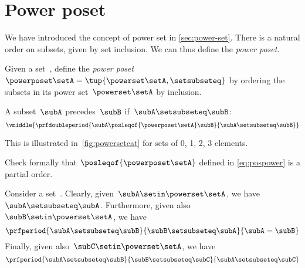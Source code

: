 
\section{Power poset}

We have introduced the concept of power set in \cref{sec:power-set}.
There is a natural order on subsets, given by set inclusion.
We can thus define the \emph{power poset}.

\begin{definition}
    \label{def:power-poset}
    Given a set~\setA,
    define the \emph{power poset}~$\powerposet\setA = \tup{\powerset\setA,\setsubseteq}$ by ordering the subsets in its power set~$\powerset\setA$ by inclusion.

    A subset~$\subA$ precedes~$\subB$ if~$\subA \setsubseteq \subB$:
    \begin{equation} \label{eq:pospower}
        \vmiddle{
            \prfdoubleperiod{
                \subA \posleqof{\powerposet\setA} \subB
            }{
                \subA \setsubseteq \subB
            }
        }
    \end{equation}
\end{definition}
This is illustrated in~\cref{fig:powersetcat} for sets of 0, 1, 2, 3 elements.
\begin{exercise}
    Check formally that $\posleqof{\powerposet\setA}$ defined in \cref{eq:pospower} is a partial order.
\end{exercise}
\begin{solution}
    Consider a set~\setA.
    Clearly, given~$\subA\setin \powerset \setA$, we have~$\subA\setsubseteq \subA$.
    Furthermore, given also~$\subB\setin \powerset \setA$, we have
    \begin{equation}
        \prfperiod{
            \subA\setsubseteq \subB
        }{
            \subB\setsubseteq \subA
        }{
            \subA=\subB
        }
    \end{equation}
    Finally, given also~$\subC\setin \powerset \setA$, we have
    \begin{equation}
        \prfperiod{
            \subA\setsubseteq \subB
        }{
            \subB\setsubseteq \subC
        }{
            \subA\setsubseteq\subC
        }
    \end{equation}
\end{solution}
\vfill
\begin{figure*}[h]
    \centering
    \hfill
    \hfill
    \hfill
    \caption{Power set as a poset.
    }
    \label{fig:powersetcat}
\end{figure*}
\vfill
